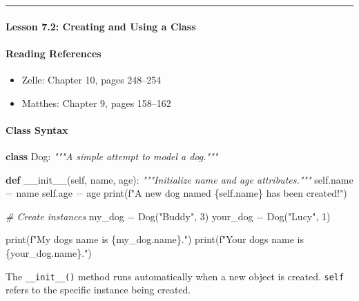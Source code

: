 \documentclass[
  justified,
  openright,
]{tufte-book}
\let\subsection\paragraph
\let\paragraph\paragraph
\newcommand{\KeywordTok}[1]{\textcolor{CodeKeyword}{\textbf{#1}}}  %
\newcommand{\StringTok}[1]{\textcolor{CodeString}{#1}}              %
\newcommand{\CommentTok}[1]{\textcolor{CodeComment}{\textit{#1}}}  %
\newcommand{\CodeNumTok}[1]{\textcolor{CodeNumber}{#1}}             %
\newcommand{\CodeFuncTok}[1]{\textcolor{CodeKeyword}{#1}}           %
\newcommand{\OperatorTok}[1]{\textcolor{DarkGray}{#1}}              %
\newenvironment{Shaded}{%
  \begin{mdframed}[style=TufteCode]%
}{%
  \end{mdframed}%
}
\let\subsection\paragraph
\let\paragraph\paragraph
\providecommand{\tightlist}{%
  \setlength{\itemsep}{0pt}\setlength{\parskip}{0pt}}
\begin{document}
\begin{center}\rule{0.5\linewidth}{0.5pt}\end{center}

\subsection{Lesson 7.2: Creating and Using a
Class}\label{lesson-7.2-creating-and-using-a-class}

\subsection{Reading References}\label{reading-references-20}

\begin{itemize}
\tightlist
\item
  Zelle: Chapter 10, pages 248--254
\item
  Matthes: Chapter 9, pages 158--162
\end{itemize}

\subsection{Class Syntax}\label{class-syntax}

\begin{Shaded}
\begin{Highlighting}[]
\KeywordTok{class} Dog:
    \CommentTok{"""A simple attempt to model a dog."""}
 
    \KeywordTok{def} \CodeFuncTok{\_\_init\_\_}(self, name, age):
        \CommentTok{"""Initialize name and age attributes."""}
        self.name \OperatorTok{=} name
        self.age \OperatorTok{=} age
        print(\StringTok{f"A new dog named }\StringTok{\{}self\StringTok{.}name\StringTok{\}}\StringTok{ has been created!"})
 
\CommentTok{\# Create instances}
my\_dog \OperatorTok{=} Dog(\StringTok{"Buddy"}, \CodeNumTok{3})
your\_dog \OperatorTok{=} Dog(\StringTok{"Lucy"}, \CodeNumTok{1})
 
print(\StringTok{f"My dog\textquotesingle{}s name is }\StringTok{\{}my\_dog\StringTok{.}name\StringTok{\}}\StringTok{."})
print(\StringTok{f"Your dog\textquotesingle{}s name is }\StringTok{\{}your\_dog\StringTok{.}name\StringTok{\}}\StringTok{."})
\end{Highlighting}
\end{Shaded}

The \texttt{\_\_init\_\_()} method runs automatically when a new object
is created. \texttt{self} refers to the specific instance being created.
\end{document}
